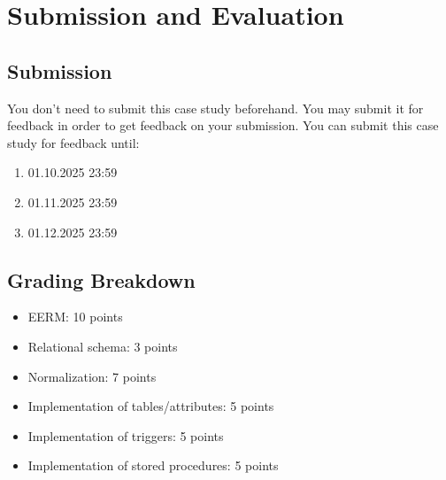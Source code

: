 \section{Submission and Evaluation}

\subsection{Submission}
You don't need to submit this case study beforehand. You may submit it for feedback in order to get feedback on your submission. You can submit this case study for feedback until:

\begin{enumerate}
    \item 01.10.2025 23:59
    \item 01.11.2025 23:59
    \item 01.12.2025 23:59
\end{enumerate}

\subsection{Grading Breakdown}

\begin{itemize}
    \item EERM: 10 points
    \item Relational schema: 3 points
    \item Normalization: 7 points
    \item Implementation of tables/attributes: 5 points
    \item Implementation of triggers: 5 points
    \item Implementation of stored procedures: 5 points
\end{itemize}